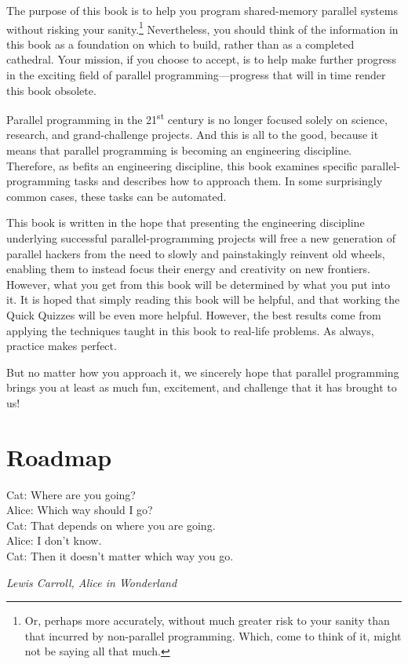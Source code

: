 
%

The purpose of this book is to help you program
shared-memory parallel systems without risking your sanity.\footnote{
	Or, perhaps more accurately, without much greater risk to your
	sanity than that incurred by non-parallel programming.
	Which, come to think of it, might not be saying all that much.}
Nevertheless, you should think of the information in this book as a
foundation on which to build, rather than as a completed cathedral.
Your mission, if you choose to accept, is to help make further progress
in the exciting field of parallel programming---progress that will
in time render this book obsolete.

Parallel programming in the 21\textsuperscript{st} century is no longer
focused solely on science, research, and grand-challenge projects.
And this is all to the good, because it means that parallel programming
is becoming an engineering discipline.
Therefore, as befits an engineering discipline, this book examines
specific parallel-programming tasks and describes how to approach them.
In some surprisingly common cases, these tasks can be automated.

This book is written in the hope that presenting the engineering
discipline underlying successful
parallel-programming projects will free a new generation of parallel hackers
from the need to slowly and painstakingly reinvent old wheels, enabling
them to instead focus their energy and creativity on new frontiers.
However, what you get from this book will be determined by what you
put into it.
It is hoped that simply reading this book will be helpful,
and that working the Quick Quizzes will be even more helpful.
However, the best results come from applying the techniques taught
in this book to real-life problems.
As always, practice makes perfect.

But no matter how you approach it, we sincerely hope that parallel
programming brings you at least as much fun, excitement, and challenge
that it has brought to us!

\section{Roadmap}
\label{sec:howto:Roadmap}
%
\epigraph{Cat: Where are you going? \\
	  Alice: Which way should I go? \\
	  Cat: That depends on where you are going. \\
	  Alice: I don't know. \\
	  Cat: Then it doesn't matter which way you go.}
	 {\emph{Lewis Carroll, Alice in Wonderland}}

